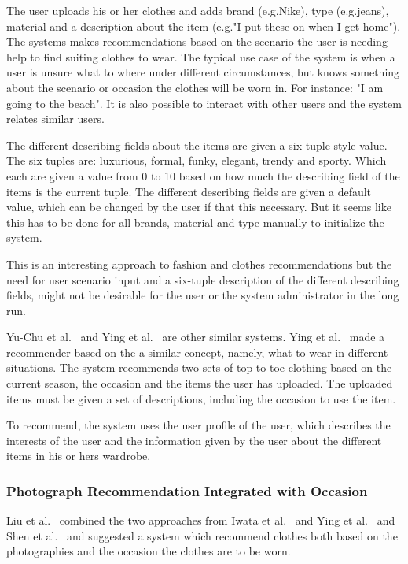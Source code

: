     The user uploads his or her clothes and adds brand (e.g.Nike), type (e.g.jeans), material and a description about the item (e.g."I put these on when I get home").
    The systems makes recommendations based on the scenario the user is needing help to find suiting clothes to wear.
    The typical use case of the system is when a user is unsure what to where under different circumstances, but knows something about the scenario or occasion the clothes will be worn in.
    For instance: "I am going to the beach".
    It is also possible to interact with other users and the system relates similar users.

    The different describing fields about the items are given a six-tuple style value.
    The six tuples are: luxurious, formal, funky, elegant, trendy and sporty.
    Which each are given a value from 0 to 10 based on how much the describing field of the items is the current tuple.
    The different describing fields are given a default value, which can be changed by the user if that this necessary. But it seems like this has to be done for all brands, material and type manually to initialize the system.

    This is an interesting approach to fashion and clothes recommendations but the need for user scenario input and a six-tuple description of the different describing fields, might not be desirable for the user or the system administrator in the long run.

    Yu-Chu et al.~\cite{Yu-Chu:2012:PCS:2376365.2376961} and Ying et al.~\cite{Ying2011} are other similar systems. Ying et al.~\cite{Ying2011} made a recommender based on the a similar concept, namely, what to wear in different situations.
    The system recommends two sets of top-to-toe clothing based on the current season, the occasion and the items the user has uploaded.
    The uploaded items must be given a set of descriptions, including the occasion to use the item.

    To recommend, the system uses the user profile of the user, which describes the interests of the user and the information given by the user about the different items in his or hers wardrobe.

\subsubsection{Photograph Recommendation Integrated with Occasion} %
\label{par:photograph_recommendation_integrated_with_occasion}
    Liu et al.~\cite{Liu:2012:HMC:2393347.2393433} combined the two approaches from Iwata et al.~\cite{Iwata:2011} and Ying et al.~\cite{Ying2011} and Shen et al.~\cite{Shen:2007:AIG:1216295.1216368} and suggested a system which recommend clothes both based on the photographies and the occasion the clothes are to be worn.

